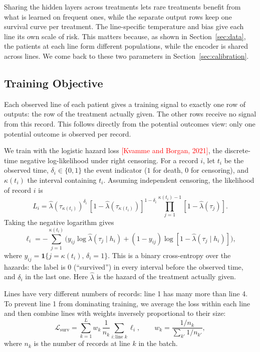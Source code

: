 \documentclass[a4paper,10pt]{article}
\newcommand{\todo}[1]{\textcolor{red}{#1}}
\begin{document}
Sharing the hidden layers across treatments lets rare treatments benefit from what is learned on frequent ones, while the separate output rows keep one survival curve per treatment. The line-specific temperature and bias give each line its own scale of risk. This matters because, as shown in Section~\ref{sec:data}, the patients at each line form different populations, while the encoder is shared across lines. We come back to these two parameters in Section~\ref{sec:calibration}.

\subsection{Training Objective}
\label{sec:training}

Each observed line of each patient gives a training signal to exactly one row of outputs: the row of the treatment actually given. The other rows receive no signal from this record. This follows directly from the potential outcomes view: only one potential outcome is observed per record.

We train with the logistic hazard loss \todo{[Kvamme and Borgan, 2021]}, the discrete-time negative log-likelihood under right censoring. For a record $i$, let $t_i$ be the observed time, $\delta_i \in \{0,1\}$ the event indicator ($1$ for death, $0$ for censoring), and $\kappa(t_i)$ the interval containing $t_i$. Assuming independent censoring, the likelihood of record $i$ is
\begin{equation}
    L_i = \hat{\lambda}(\tau_{\kappa(t_i)})^{\delta_i} \, [1 - \hat{\lambda}(\tau_{\kappa(t_i)})]^{1 - \delta_i} \prod_{j=1}^{\kappa(t_i) - 1} [1 - \hat{\lambda}(\tau_j)].
\end{equation}
Taking the negative logarithm gives
\begin{equation}
    \ell_i = - \sum_{j=1}^{\kappa(t_i)} \Big( y_{ij} \log \hat{\lambda}(\tau_j \mid h_i) + (1 - y_{ij}) \log [1 - \hat{\lambda}(\tau_j \mid h_i)] \Big),
    \label{eq:logistic-hazard-loss}
\end{equation}
where $y_{ij} = \mathbf{1}\{j = \kappa(t_i),\, \delta_i = 1\}$. This is a binary cross-entropy over the hazards: the label is 0 (``survived'') in every interval before the observed time, and $\delta_i$ in the last one. Here $\hat{\lambda}$ is the hazard of the treatment actually given.

Lines have very different numbers of records: line 1 has many more than line 4. To prevent line 1 from dominating training, we average the loss within each line and then combine lines with weights inversely proportional to their size:
\begin{equation}
    \mathcal{L}_{\text{surv}} = \sum_{k=1}^{L} w_k \, \frac{1}{n_k} \sum_{i : \text{line } k} \ell_{i}, \qquad w_k = \frac{1/n_k}{\sum_{k'} 1/n_{k'}},
\end{equation}
where $n_k$ is the number of records at line $k$ in the batch.
\end{document}
